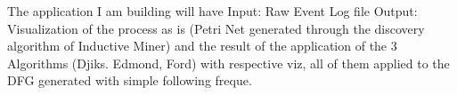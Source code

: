 The application I am building will have 
Input: Raw Event Log file
Output: Visualization of the process as is (Petri Net generated through the discovery algorithm of Inductive Miner) and the result of the application of the 3 Algorithms (Djiks. Edmond, Ford) with respective viz, all of them applied to the DFG generated with simple following freque.